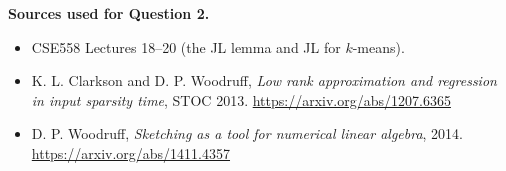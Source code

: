 \textbf{Sources used for Question 2.}
\begin{itemize}
    \item CSE558 Lectures 18--20 (the JL lemma and JL for $k$-means).
    \item K. L. Clarkson and D. P. Woodruff, \emph{Low rank approximation and regression in input sparsity
    time}, STOC 2013. \url{https://arxiv.org/abs/1207.6365}
    \item D. P. Woodruff, \emph{Sketching as a tool for numerical linear algebra}, 2014.
    \url{https://arxiv.org/abs/1411.4357}
\end{itemize}

